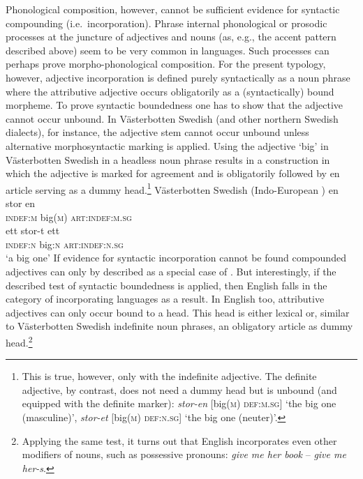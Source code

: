 Phonological composition, however, cannot be sufficient evidence for syntactic compounding (i.e.~incorporation). Phrase internal phonological or prosodic processes at the juncture of adjectives and nouns (as, e.g., the accent pattern described above) seem to be very common in languages. Such processes can perhaps prove morpho-phonological composition. For the present typology, however, adjective incorporation is defined purely syntactically as a noun phrase where the attributive adjective occurs obligatorily as a (syntactically) bound morpheme. To prove syntactic boundedness one has to show that the adjective cannot occur unbound. In Västerbotten Swedish (and other northern Swedish dialects), for instance, the adjective stem cannot occur unbound unless alternative morphosyntactic marking is applied. Using the adjective ‘big’ in Västerbotten Swedish in a headless noun phrase results in a construction in which the adjective is marked for agreement and is obligatorily followed by en article serving as a dummy head.\footnote{This is true, however, only with the indefinite adjective. The definite adjective, by contrast, does not need a dummy head but is unbound (and equipped with the definite marker): \textit{stor-en} [big(\textsc{m}) \textsc{def:m.sg}] ‘the big one (masculine)’, \textit{stor-et} [big(\textsc{m}) \textsc{def:n.sg}] ‘the big one (neuter)’.}
\ea 
\label{bondska headless}
\rm{Västerbotten Swedish (Indo-European \citep{larsson1929})}
\ea
\gll 	en stor en\\	
	\textsc{indef:m} big(\textsc{m}) \textsc{art:indef:m.sg}\\
\ex
\gll 	ett stor-t ett\\	
	\textsc{indef:n} big:\textsc{n} \textsc{art:indef:n.sg}\\
\glt	‘a big one’
\z
\z
If evidence for syntactic incorporation cannot be found compounded adjectives can only by described as a special case of . But interestingly, if the described test of syntactic boundedness is applied, then English falls in the category of incorporating languages as a result. In English too, attributive adjectives can only occur bound to a head. This head is either lexical or, similar to Västerbotten Swedish indefinite noun phrases, an obligatory article as dummy head.\footnote{Applying the same test, it turns out that English incorporates even other modifiers of nouns, such as possessive pronouns: \textit{give me her book} – \textit{give me her-s}.}

